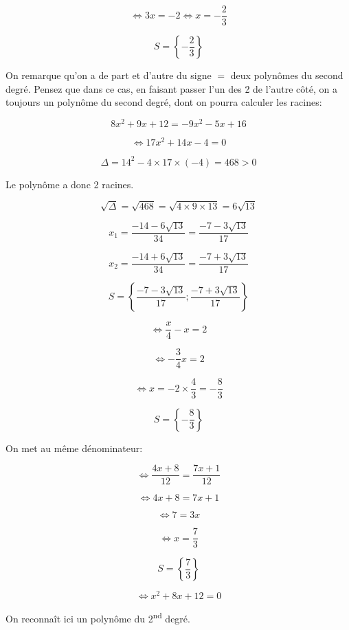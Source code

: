 \documentclass[a4paper,12pt]{scrartcl}
\begin{document}

$$\Leftrightarrow 3x = -2 \Leftrightarrow x = -\dfrac{2}{3}$$

$$S = \left\{ -\dfrac{2}{3} \right\}$$


On remarque qu'on a de part et d'autre du signe $=$ deux polynômes du second degré. Pensez que dans ce cas, en faisant passer l'un des 2 de l'autre côté, on a toujours un polynôme du second degré, dont on pourra calculer les racines:

$$8x^2 + 9x + 12 = -9x^2 - 5x + 16$$

$$\Leftrightarrow 17x^2 + 14x - 4 = 0$$

$$\Delta = 14^2 - 4 \times 17 \times (-4) = 468 > 0$$

Le polynôme a donc 2 racines.

$$\sqrt{\Delta} = \sqrt{468} = \sqrt{4 \times 9 \times 13} = 6\sqrt{13}$$

$$x_1 = \dfrac{-14 - 6\sqrt{13}}{34} = \dfrac{-7 - 3\sqrt{13}}{17}$$

$$x_2 = \dfrac{-14 + 6\sqrt{13}}{34} = \dfrac{-7 + 3\sqrt{13}}{17}$$

$$S = \left\{ \dfrac{-7 - 3\sqrt{13}}{17} ; \dfrac{-7 + 3\sqrt{13}}{17} \right\}$$


$$\Leftrightarrow \dfrac{x}{4} - x = 2$$

$$\Leftrightarrow -\dfrac{3}{4}x = 2$$

$$\Leftrightarrow x = -2 \times \dfrac{4}{3} = -\dfrac{8}{3}$$

$$S = \left\{ -\dfrac{8}{3}\right\}$$



On met au même dénominateur:

$$\Leftrightarrow \dfrac{4x + 8}{12}  = \dfrac{7x + 1}{12}$$

$$\Leftrightarrow 4x + 8 = 7x + 1$$

$$\Leftrightarrow 7 = 3x$$

$$\Leftrightarrow x = \dfrac{7}{3}$$

$$S = \left\{ \dfrac{7}{3}\right\}$$


$$\Leftrightarrow x^2 + 8x + 12 = 0$$

On reconnaît ici un polynôme du 2\textsuperscript{nd} degré.
\end{document}
